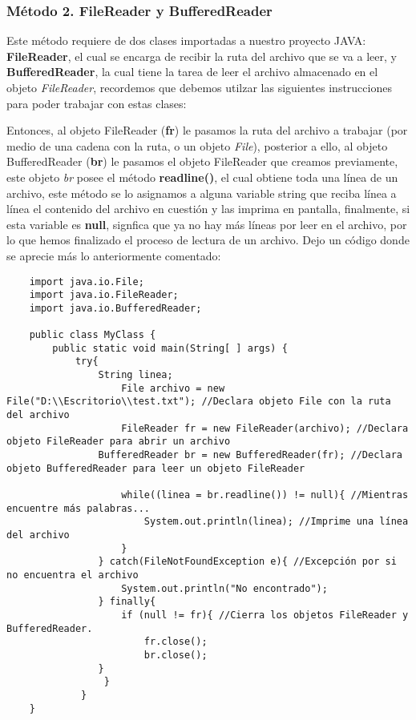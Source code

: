 \subsubsection{Método 2. FileReader y BufferedReader}
Este método requiere de dos clases importadas a nuestro proyecto JAVA: \textbf{FileReader}, el cual se encarga de recibir la ruta del archivo que se va a leer, y \textbf{BufferedReader}, la cual tiene la tarea de leer el archivo almacenado en el objeto \textit{FileReader}, recordemos que debemos utilzar las siguientes instrucciones para poder trabajar con estas clases:\begin{center}\textit{import java.io.FileReader;\}\end{center}
Entonces, al objeto FileReader (\textbf{fr}) le pasamos la ruta del archivo a trabajar (por medio de una cadena con la ruta, o un objeto \textit{File}), posterior a ello, al objeto BufferedReader (\textbf{br}) le pasamos el objeto FileReader que creamos previamente, este objeto \textit{br} posee el método \textbf{readline()}, el cual obtiene toda una línea de un archivo, este método se lo asignamos a alguna variable string que reciba línea a línea el contenido del archivo en cuestión y las imprima en pantalla, finalmente, si esta variable es \textbf{null}, signfica que ya no hay más líneas por leer en el archivo, por lo que hemos finalizado el proceso de lectura de un archivo. Dejo un código donde se aprecie más lo anteriormente comentado:
\begin{lstlisting}
	import java.io.File;
	import java.io.FileReader;
	import java.io.BufferedReader;

	public class MyClass {
		public static void main(String[ ] args) {
			try{
				String linea;
		    	    File archivo = new File("D:\\Escritorio\\test.txt"); //Declara objeto File con la ruta del archivo
    			    FileReader fr = new FileReader(archivo); //Declara objeto FileReader para abrir un archivo
				BufferedReader br = new BufferedReader(fr); //Declara objeto BufferedReader para leer un objeto FileReader
        
        			while((linea = br.readline()) != null){ //Mientras encuentre más palabras...
            			System.out.println(linea); //Imprime una línea del archivo
	        		}
    			} catch(FileNotFoundException e){ //Excepción por si no encuentra el archivo
        			System.out.println("No encontrado");
	    		} finally{
    		     	if (null != fr){ //Cierra los objetos FileReader y BufferedReader.
         	    		fr.close();
             			br.close();
	           	}
    		     }
	    	 }
	}
\end{lstlisting}

